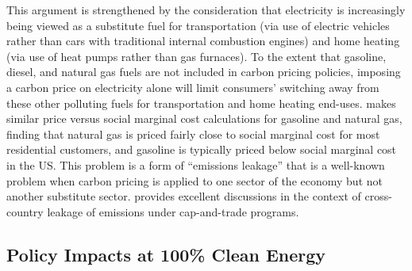 \documentclass[12pt]{article}
\begin{document}
This argument is strengthened by the consideration that electricity is increasingly being viewed as a substitute fuel for transportation (via use of electric vehicles rather than cars with traditional internal combustion engines) and home heating (via use of heat pumps rather than gas furnaces). To the extent that gasoline, diesel, and natural gas fuels are not included in carbon pricing policies, imposing a carbon price on electricity alone will limit consumers' switching away from these other polluting fuels for transportation and home heating end-uses. \cite{borenstein2022headwinds} makes similar price versus social marginal cost calculations for gasoline and natural gas, finding that natural gas is priced fairly close to social marginal cost for most residential customers, and gasoline is typically priced below social marginal cost in the US. This problem is a form of ``emissions leakage'' that is a well-known problem when carbon pricing is applied to one sector of the economy but not another substitute sector. \cite{FRR16} provides excellent discussions in the context of cross-country leakage of emissions under cap-and-trade programs.



\subsection{Policy Impacts at 100\% Clean Energy}\label{sec:fulldecarb}
\end{document}
